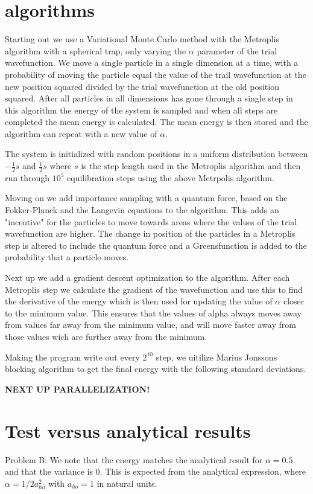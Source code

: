 \documentclass[a4paper, 10pt, english]{revtex4-2} %
\begin{document}
\section*{\large algorithms}
    Starting out we use a Variational Monte Carlo method with the Metroplis algorithm with a spherical trap, only varying the $\alpha$ parameter of the trial wavefunction.
    We move a single particle in a single dimension at a time, with a probability of moving the particle equal the value of the trail wavefunction at the new position squared divided by the trial wavefunction at the old position squared.
    After all particles in all dimensions has gone through a single step in this algorithm the energy of the system is sampled and when all steps are completed the mean energy is calculated.
    The mean energy is then stored and the algorithm can repeat with a new value of $\alpha$.

    The system is initialized with random positions in a uniform distribution between $-\frac{1}{2}s$ and $\frac{1}{2}s$ where $s$ is the step length used in the Metroplis algorithm and then run through $10^5$ equilibration steps using the above Metrpolis algorithm.


    Moving on we add importance sampling with a quantum force, based on the Fokker-Planck and the Langevin equations to the algorithm.
    This adds an "incentive" for the particles to move towards areas where the values of the trial wavefunction are higher.
    The change in position of the particles in a Metroplis step is altered to include the quantum force and a Greensfunction is added to the probability that a particle moves.

    Next up we add a gradient descent optimization to the algorithm.
    After each Metroplis step we calculate the gradient of the wavefunction and use this to find the derivative of the energy which is then used for updating the value of $\alpha$ closer to the minimum value.
    This ensures that the values of alpha always moves away from values far away from the minimum value, and will move faster away from those values wich are further away from the minimum.

    Making the program write out every $2^{10}$ step, we uitilize Marius Jonssons blocking algorithm to get the final energy with the following standard deviations.

    \textbf{NEXT UP PARALLELIZATION!}

    
\section*{\large Test versus analytical results}
    Problem B: We note that the energy matches the analytical result for $\alpha = 0.5$ and that the variance is 0.
    This is expected from the analytical expression, where $\alpha = 1/2a_{ho}^2$ with $a_{ho} = 1$ in natural units.
    
\end{document}
